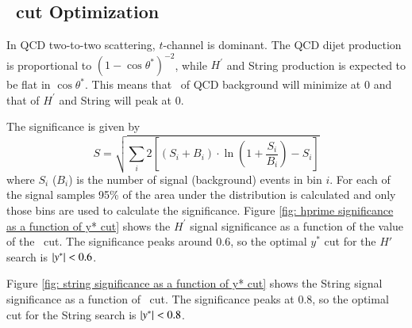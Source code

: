 \subsection{\ystar\ cut Optimization}
\label{section:ystarCutOptimization}


In QCD two-to-two scattering, $t$-channel is dominant. The QCD dijet production is proportional to 
$\displaystyle{(1-\cos\theta^{*})^{-2}}$, while $H^\prime$ and String production is expected to be flat in 
$\cos\theta^{*}$. This means that \ystar\  of QCD background will minimize at 0 and that of $H^\prime$  
and String will peak at 0.


The significance is given by 
\begin{equation}
\label{eq:signifcanceYstar} %
S  = \sqrt{\sum_{i}{2\left[ \left(S_{i}+B_{i} \right)\cdot \ln \left(1+\frac{S_{i}}{B_{i}}\right)-S_{i}\right]}}
\end{equation}
where $S_i$ ($B_i$) is the number of signal (background) events in bin $i$. 
For each of the signal samples 95\% of the area under the distribution is 
calculated and only those bins are used to calculate the significance. %
Figure \ref{fig: hprime significance as a function of y* cut} shows the $H^\prime$ signal significance as a function 
of the value of the \ystar\  cut. The significance peaks  around 0.6, so the optimal $y^{*}$ cut for the $H'$ search is 
$|y^\ast| < 0.6$. 

Figure \ref{fig: string significance as a function of y* cut} shows the String signal significance as a function of \ystar\ cut. The significance peaks at  0.8, so the optimal  cut for the String search is $|y^\ast| < 0.8$.

